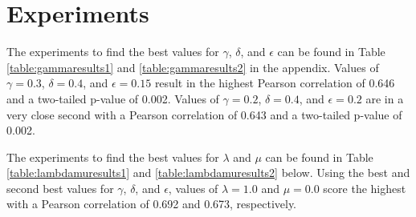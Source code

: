 \documentclass{article}
\begin{document}





\section{Experiments} \label{sec:experiments} %

The experiments to find the best values for $\gamma$, $\delta$, and $\epsilon$ can be found in Table \ref{table:gammaresults1} and \ref{table:gammaresults2} in the appendix. Values of $\gamma = 0.3$, $\delta = 0.4$, and $\epsilon = 0.15$ result in the highest Pearson correlation of 0.646 and a two-tailed p-value of 0.002. Values of $\gamma = 0.2$, $\delta = 0.4$, and $\epsilon = 0.2$ are in a very close second with a Pearson correlation of 0.643 and a two-tailed p-value of 0.002. 

The experiments to find the best values for $\lambda$ and $\mu$ can be found in Table \ref{table:lambdamuresults1} and \ref{table:lambdamuresults2} below. Using the best and second best values for $\gamma$, $\delta$, and $\epsilon$, values of $\lambda = 1.0$ and $\mu = 0.0$ score the highest with a Pearson correlation of 0.692 and 0.673, respectively. 
\end{document}

